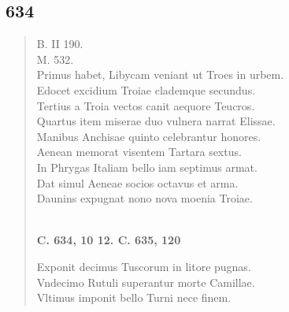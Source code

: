 \documentclass[11pt, a4paper]{report}
\begin{document}
            \subsection*{634}
      \begin{verse}
      B. II 190. \\ M. 532. \\ Primus habet, Libycam veniant ut Troes in urbem. \\ Edocet excidium Troiae clademque secundus. \\ Tertius a Troia vectos canit aequore Teucros. \\ Quartus item miserae duo vulnera narrat Elissae. \\ Manibus Anchisae quinto celebrantur honores. \\ Aenean memorat visentem Tartara sextus. \\ In Phrygas Italiam bello iam septimus armat. \\ Dat simul Aeneae socios octavus et arma. \\ Daunins expugnat nono nova moenia Troiae. \\ 
        ﻿\pagebreak 
    \begin{center} \textbf{C. 634, 10 12. C. 635, 120} \end{center} \marginpar{[101]} Exponit decimus Tuscorum in litore pugnas. \\ Vndecimo Rutuli superantur morte Camillae. \\ Vltimus imponit bello Turni nece finem. \\ 
      \end{verse}
  
\end{document}
